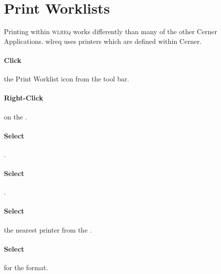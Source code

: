 

\section{Print Worklists}

Printing within \textsc{\gls{wlreq}} works differently than many of the other Cerner Applications. \gls{wlreq} uses printers which are defined within Cerner.

\paragraph{Click} the Print Worklist  icon from the tool bar.\\


\paragraph{Right-Click} on the .

\paragraph{Select} .

\paragraph{Select} .\\


\clearpage

\paragraph{Select} the nearest printer from the .\\



\paragraph{Select}  for the format.\\

